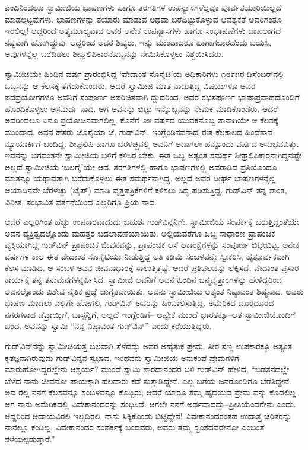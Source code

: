 ಎಂದಿನಿಂದಲೂ ಸ್ವಾಮೀಜಿಯ ಭಾಷಣಗಳು ಹಾಗೂ ತರಗತಿಗಳ ಉಪನ್ಯಾಸಗಳೆಲ್ಲವೂ ಪೂರ್ವತಯಾರಿಯಿಲ್ಲದೆ ಮಾಡಲ್ಪಟ್ಟವುಗಳು. ಭಾಷಣಗಳನ್ನು ತಯಾರು ಮಾಡುವ ಅಥವಾ ಬರೆದಿಟ್ಟುಕೊಳ್ಳುವ ಆವಶ್ಯಕತೆ ಅವರಿಗಂತೂ ಇರಲಿಲ್ಲ! ಆದ್ದರಿಂದ ಅತ್ಯಮೂಲ್ಯವಾದ ಅವರ ಅನೇಕ ಉಪನ್ಯಾಸಗಳು ಹಾಗೂ ಸಂಭಾಷಣೆಗಳು ದಾಖಲಾಗದೆ ನಷ್ಟವಾಗಿ ಹೋಗಿದ್ದುವು. ಆದ್ದರಿಂದ ಅವರ ಶಿಷ್ಯರು, ಇನ್ನು ಮುಂದಾದರೂ ಹಾಗಾಗಬಾರದೆಂದು ಬಯಸಿ, ಅವುಗಳನ್ನೆಲ್ಲ ಬರೆದಿಡಲು ಶೀಘ್ರಲಿಪಿಕಾರನೊಬ್ಬನನ್ನು ನೇಮಿಸಿಕೊಳ್ಳಲು ನಿಶ್ಚಯಿಸಿದರು.

ಸ್ವಾಮೀಜಿಯೇ ಹಿಂದಿನ ವರ್ಷ ಪ್ರಾರಂಭಿಸಿದ್ದ ‘ವೇದಾಂತ ಸೊಸೈಟಿ’ಯ ಅಧಿಕಾರಿಗಳು ೧೮೯೫ರ ಡಿಸೆಂಬರ್​ನಲ್ಲಿ ಒಬ್ಬನನ್ನು ಆ ಕೆಲಸಕ್ಕೆ ತೆಗೆದುಕೊಂಡರು. ಆದರೆ ಸ್ವಾಮೀಜಿ ಮಾತ ನಾಡುತ್ತಿದ್ದ ವಿಷಯಗಳೂ ಅವರ ಪದಪ್ರಯೋಗಗಳೂ ಅವನಿಗೆ ಸಂಪೂರ್ಣ ಅಪರಿಚಿತವಾಗಿ ದ್ದುದರಿಂದ, ಅವರ ರಭಸಪೂರ್ಣ ಭಾಷಾಪ್ರವಾಹದೊಂದಿಗೆ ಹೊಂದಿಕೊಳ್ಳಲು ಅಸಮರ್ಥ ನಾದ. ಆಗ ಅವನನ್ನು ಬಿಟ್ಟು ಇನ್ನೊಬ್ಬನನ್ನು ನೇಮಕ ಮಾಡಿಕೊಂಡರು. ಆದರೆ ಅದರಿಂದಲೂ ಏನೂ ಪ್ರಯೋಜನವಾಗಲಿಲ್ಲ. ಕೊನೆಗೆ ೨೫ ವರ್ಷದ ಯುವಕನೊಬ್ಬ ತಾನಾಗಿಯೇ ಆ ಕೆಲಸಕ್ಕೆ ಮುಂದಾದ. ಅವನ ಹೆಸರು ಜೊಸೈಯಾ ಜೆ. ಗುಡ್​ವಿನ್. ಇಂಗ್ಲೆಂಡಿನವನಾದ ಈತ ಕೆಲಕಾಲದ ಹಿಂದೆತಾನೆ ನ್ಯೂಯಾರ್ಕಿಗೆ ಬಂದಿದ್ದ. ಶೀಘ್ರಲಿಪಿ ಹಾಗೂ ಬೆರಳಚ್ಚಿನಲ್ಲಿ ಅವನಿಗೆ ಅದಾಗಲೇ ಹನ್ನೊಂದು ವರ್ಷದ ಅನುಭವವಿತ್ತು. ಇವನನ್ನು ಭಗವಂತನೇ ಸ್ವಾಮೀಜಿಯ ಬಳಿಗೆ ಕಳಿಸಿರ ಬೇಕು. ಈತ ಒಬ್ಬ ಅತ್ಯಂತ ಸಮರ್ಥ ಶೀಘ್ರಲಿಪಿಕಾರನಾಗಿದ್ದನಷ್ಟೇ ಅಲ್ಲದೆ ಸ್ವಾಮೀಜಿಯ ‘ಬಲಗೈ’ಯೇ ಆದ. ತರಗತಿಗಳಲ್ಲಿ ಹಾಗೂ ಭಾಷಣಗಳಲ್ಲಿ ಅವರಾಡಿದ ಪ್ರತಿಯೊಂದೂ ಮಾತನ್ನೂ ಯಥಾವತ್ತಾಗಿ ಬರೆದುಕೊಳ್ಳಲು ಈತ ಸಮರ್ಥನಾಗಿದ್ದ. ಅಲ್ಲದೆ ಅವರ ದೀರ್ಘ ಭಾಷಣಗಳನ್ನೆಲ್ಲ ಆಯಾದಿನವೇ ಬೆರಳಚ್ಚು (ಟೈಪ್​) ಮಾಡಿ ವೃತ್ತಪತ್ರಿಕೆಗಳಿಗೆ ಕಳಿಸಲು ಸಿದ್ಧ ಪಡಿಸುತ್ತಿದ್ದ. ಗುಡ್​ವಿನ್ ತನ್ನ ಶಾಂತ, ವಿನೀತ, ಸಂಭಾವಿತ ವರ್ತನೆಯಿಂದ ಎಲ್ಲರಿಗೂ ಪ್ರಿಯ ನಾದ.

ಆದರೆ ಎಲ್ಲರಿಗಿಂತ ಹೆಚ್ಚು ಉಪಕಾರವಾದುದು ಬಹುಶಃ ಗುಡ್​ವಿನ್ನನಿಗೇ. ಸ್ವಾಮೀಜಿಯ ಸಂಪರ್ಕಕ್ಕೆ ಬರುತ್ತಿದ್ದಂತೆಯೇ ಅವನ ವ್ಯಕ್ತಿತ್ವದಲ್ಲೊಂದು ಮಹತ್ತರ ಬದಲಾವಣೆಯಾಯಿತು. ಅಲ್ಲಿಯವರೆಗೂ ಒಬ್ಬ ಸಾಧಾರಣ ಪ್ರಾಪಂಚಿಕ ವ್ಯಕ್ತಿಯಾಗಿದ್ದ ಗುಡ್​ವಿನ್ ಪ್ರಾಪಂಚಿಕ ಜೀವನವನ್ನು, ಪ್ರಾಪಂಚಿಕ ಆಸೆ ಆಕಾಂಕ್ಷೆಗಳನ್ನು ಸಂಪೂರ್ಣ ಬಿಟ್ಟೇಬಿಟ್ಟ. ಅನೇಕ ವರ್ಷಗಳ ಕಾಲ ಈತ ವೇದಾಂತ ಸೊಸೈಟಿಯು ನೀಡುತ್ತಿದ್ದ ಅತಿ ಕಡಿಮೆ ಸಂಬಳವನ್ನೇ ಸ್ವೀಕರಿಸಿ, ಹೃತ್ಪೂರ್ವಕವಾಗಿ ಕೆಲಸ ಮಾಡಿದ. ಆ ಸಂಬಳ ಅವನ ಜೀವನಾಧಾರಕ್ಕೆ ಸಾಲುತ್ತಿತ್ತಷ್ಟೆ. ಆದರೆ ಪ್ರತಿಫಲವನ್ನು ಲೆಕ್ಕಿಸದೆ, ವೇದಾಂತ ಪ್ರಸಾರ ಕಾರ್ಯಕ್ಕೆ ತನ್ನ ತನುಮನಗಳನ್ನರ್ಪಿಸಿದ. ಸ್ವಾಮೀಜಿ ಅವನಿಗೆ ಅವನ ಹಿಂದಿನ ಜನ್ಮವೃತ್ತಾಂಗಳನ್ನು ಹೇಳಿದ್ದರಿಂದ ಅವನಲ್ಲೊಂದು ವಿಶೇಷ ನೈತಿಕ ಪ್ರಜ್ಞೆ ಜಾಗೃತವಾಯಿತು. ಅವನು ಸ್ವಾಮೀಜಿಯ ಅತ್ಯಂತ ನಿಷ್ಠಾವಂತ ಶಿಷ್ಯನಾದ. ಅವರು ಭಾಷಣ ಮಾಡಲು ಎಲ್ಲಿಗೇ ಹೋಗಲಿ, ಗುಡ್​ವಿನ್ ಅವರನ್ನು ಹಿಂಬಾಲಿಸುತ್ತಿದ್ದ. ಅಮೆರಿಕದ ದೂರದೂರದ ನಗರಗಳಾದ ಡೆಟ್ರಾಯ್ಟಿಗೆ, ಬಾಸ್ಟನ್ನಿಗೆ, ಅಲ್ಲದೆ ಇಂಗ್ಲೆಂಡಿಗೆ– ಅಷ್ಟೇಕೆ ಮುಂದೆ ಭಾರತಕ್ಕೂ–ಆತ ಸ್ವಾಮೀಜಿಯೊಂದಿಗೆ ಬಂದ. ಅವನನ್ನು ಸ್ವಾಮಿ “ನನ್ನ ನಿಷ್ಠಾವಂತ ಗುಡ್​ವಿನ್​” ಎಂದು ಕರೆಯುತ್ತಿದ್ದರು.

ಗುಡ್​ವಿನ್​ನನ್ನು ಸ್ವಾಮೀಜಿಯತ್ತ ಬಲವಾಗಿ ಸೆಳೆದದ್ದು ಅವರ ಅಹೈತುಕ ಪ್ರೇಮ. ತೀರ ಸಣ್ಣ ಉಪಕಾರಕ್ಕೂ ಅತ್ಯಂತ ಕೃತಜ್ಞನಾಗಿರುವುದು ಗುಡ್​ವಿನ್ನನ ಸ್ವಭಾವ. ಇಂಥವನು ಸ್ವಾಮೀಜಿಯ ಅನುಕಂಪೆ-ಪ್ರೇಮಗಳಿಗೆ ಮಾರುಹೋಗಿದ್ದರಲ್ಲೇನು ಆಶ್ಚರ್ಯ? ಮುಂದೆ ಸ್ವಾಮಿ ಶಾರದಾನಂದರ ಬಳಿ ಗುಡ್​ವಿನ್ ಹೇಳಿದ, “ಬಡತನದಲ್ಲೇ ಬೆಳೆದ ನಾನು ಜೀವನೋ ಪಾಯಕ್ಕಾಗಿ ಹಲವಾರು ಕಡೆ ಸುತ್ತಾಡಿದ್ದೇನೆ. ಎಲ್ಲ ಬಗೆಯ ಜನರೊಂದಿಗೂ ಬೆರೆತಿದ್ದೇನೆ. ಅವ ರೆಲ್ಲ ನನಗೆ ಕೆಲಸವನ್ನೂ ಸಂಬಳವನ್ನೂ ಕೊಟ್ಟರು; ಆದರೆ ಯಾರೂ ತಮ್ಮ ಹೃದಯದ ಪ್ರೇಮ ವನ್ನು ಕೊಡಲಿಲ್ಲ. ಆಗ ನಾನು ಅಮೆರಿಕದಲ್ಲಿ ವಿವೇಕಾನಂದರನ್ನು ಸಂಧಿಸಿದೆ. ಆಗಲೇ ನನಗೆ ಅರ್ಥವಾದದ್ದು–ಪ್ರೀತಿಯೆಂದರೇನು ಎಂದು. ಆದ್ದರಿಂದ ಆದಾಯವಿರಲಿ ಇಲ್ಲದಿರಲಿ, ನಾನು ಸಿಕ್ಕಿಕೊಂಡು ಬಿಟ್ಟಿದ್ದೇನೆ! ವಿವೇಕಾನಂದರಂತಹ ಉದಾತ್ತ ಚರಿತರನ್ನು ನಾನೆಲ್ಲೂ ಕಂಡಿಲ್ಲ. ವಿವೇಕಾನಂದರ ಸಂಪರ್ಕಕ್ಕೆ ಬಂದವರು, ಅವರು ತಮ್ಮ ಸ್ವಂತದವರೇನೋ ಎಂಬಂತೆ ಸೆಳೆಯಲ್ಪಡುತ್ತಾರೆ.”

